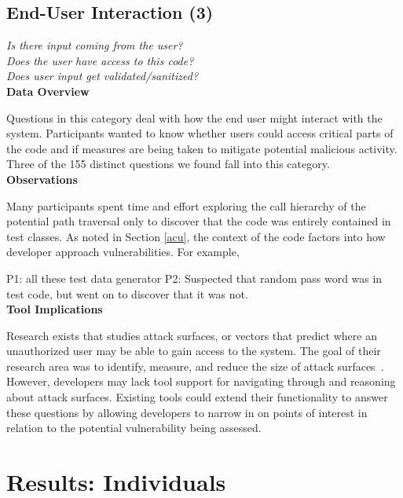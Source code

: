 \documentclass[conference]{IEEEtran}
\begin{document}

\noindent\subsection{\textbf{End-User Interaction (3)}}
\label{eui}

\noindent\emph{Is there input coming from the user?} \\
\emph{Does the user have access to this code?} \\
\emph{Does user input get validated/sanitized?} \\


\noindent\textbf{Data Overview}

Questions in this category deal with how the end user might interact with the system. 
Participants wanted to know whether users could access critical parts of the code and if measures are being taken to mitigate potential malicious activity. 
Three of the 155 distinct questions we found fall into this category.
\\

\noindent\textbf{Observations}

Many participants spent time and effort exploring the call hierarchy of the potential path traversal only to discover that the code was entirely contained in test classes. As noted in Section \ref{acu}, the context of the code factors into how developer approach vulnerabilities. For example, 

P1: all these test data generator
P2: Suspected that random pass word was in test code, but went on to discover that it was not.
\\

\noindent\textbf{Tool Implications}

Research exists that studies attack surfaces, or vectors that predict where an unauthorized user may be able to gain access to the system.
The goal of their research area was to identify, measure, and reduce the size of attack surfaces~\cite{manadhata2011attack, bartel2012automatically}. 
However, developers may lack tool support for navigating through and reasoning about attack surfaces.
Existing tools could extend their functionality to answer these questions by allowing developers to narrow in on points of interest in relation to the potential vulnerability being assessed.



\section{Results: Individuals}
\label{sec:results-i}
\end{document}
